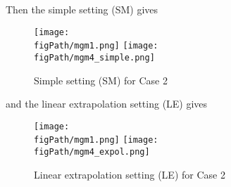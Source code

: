 Then the simple setting (SM) gives

\begin{figure}[H]
\begin{center}
\texttt{[image: \\figPath/mgm1.png]}
\texttt{[image: \\figPath/mgm4\_simple.png]}
\end{center}
\caption{Simple setting (SM) for Case 2}
\label{FIG_MGM_Grid}
\end{figure}


and the linear extrapolation setting (LE) gives

\begin{figure}[H]
\begin{center}
\texttt{[image: \\figPath/mgm1.png]}
\texttt{[image: \\figPath/mgm4\_expol.png]}
\end{center}
\caption{Linear extrapolation setting (LE) for Case 2}
\label{FIG_MGM_Grid}
\end{figure}




